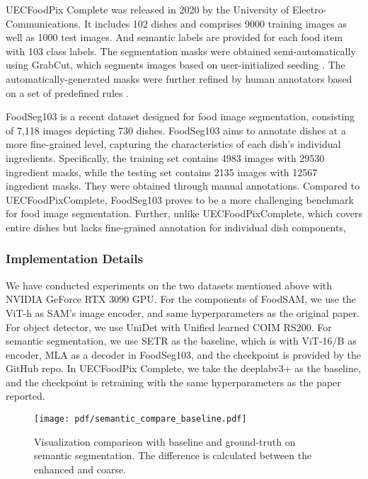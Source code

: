\documentclass[lettersize,journal]{IEEEtran}
\begin{document}
    UECFoodPix Complete \cite{okamoto2021uec} was released in 2020 by the University of Electro-Communications.
    It includes 102 dishes and comprises 9000 training images as well as 1000 test images.
    And semantic labels are provided for each food item with 103 class labels.
    The segmentation masks were obtained semi-automatically using GrabCut, which segments images based on user-initialized seeding \cite{rother2004grabcut}. 
    The automatically-generated masks were further refined by human annotators based on a set of predefined rules \cite{ege2019new}.

    FoodSeg103 \cite{wu2021large} is a recent dataset designed for food image segmentation, consisting of 7,118 images depicting 730 dishes. 
    FoodSeg103 aims to annotate dishes at a more fine-grained level, capturing the characteristics of each dish’s individual ingredients.
    Specifically, the training set contains 4983 images with 29530 ingredient masks, while the testing set contains 2135 images with 12567 ingredient masks. 
    They were obtained through manual annotations. 
    Compared to UECFoodPixComplete, FoodSeg103 proves to be a more challenging benchmark for food image segmentation.
Further, unlike UECFoodPixComplete, which covers entire dishes but lacks fine-grained annotation for individual dish components, 
    

\subsubsection*{Implementation Details}
We have conducted experiments on the two datasets mentioned above with NVIDIA GeForce RTX 3090 GPU. 
For the components of FoodSAM, we use the ViT-h \cite{dosovitskiy2020image} as SAM's image encoder, and same hyperparameters as the original paper. 
For object detector, we use UniDet\cite{zhou2022simple} with Unified learned COIM RS200. 
For semantic segmentation, we use SETR\cite{zheng2021rethinking} as the baseline, which is with ViT-16/B as encoder, MLA as a decoder in FoodSeg103, and the checkpoint is provided by the GitHub repo. 
In UECFoodPix Complete, we take the deeplabv3+ \cite{chen2018encoder} as the baseline, and the checkpoint is retraining with the same hyperparameters as the paper reported.

\begin{figure*}[tbh]
\centering
\newpage
\texttt{[image: pdf/semantic\_compare\_baseline.pdf]}
\caption{Visualization comparison with baseline and ground-truth on semantic segmentation. The difference is calculated between the enhanced and coarse.}
\label{fig: semantic vis vs. baseline}
\end{figure*}
\end{document}
